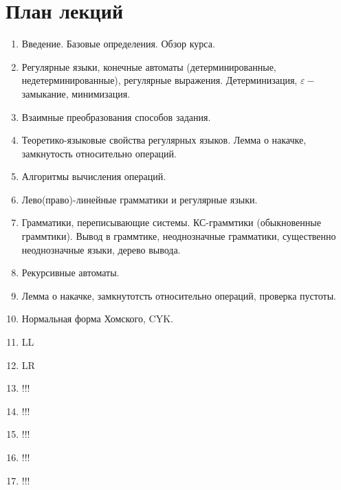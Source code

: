 \section{План лекций}
\begin{enumerate}
  \item Введение. Базовые определения. Обзор курса.
  \item Регулярные языки, конечные автоматы (детерминированные, недетерминированные), регулярные выражения. Детерминизация, $\varepsilon-$замыкание, минимизация.
  \item Взаимные преобразования способов задания.
  \item Теоретико-языковые свойства регулярных языков. Лемма о накачке, замкнутость относительно операций.
  \item Алгоритмы вычисления операций.
  \item Лево(право)-линейные грамматики и регулярные языки.
  \item Грамматики, переписывающие системы. КС-граммтики (обыкновенные граммтики). Вывод в граммтике, неоднозначные грамматики, существенно неоднозначные языки, дерево вывода.
  \item Рекурсивные автоматы.
  \item Лемма о накачке, замкнутотсть относительно операций, проверка пустоты.
  \item Нормальная форма Хомского, CYK.
  \item LL
  \item LR
  \item !!!
  \item !!!
  \item !!!
  \item !!!
  \item !!!
\end{enumerate}
